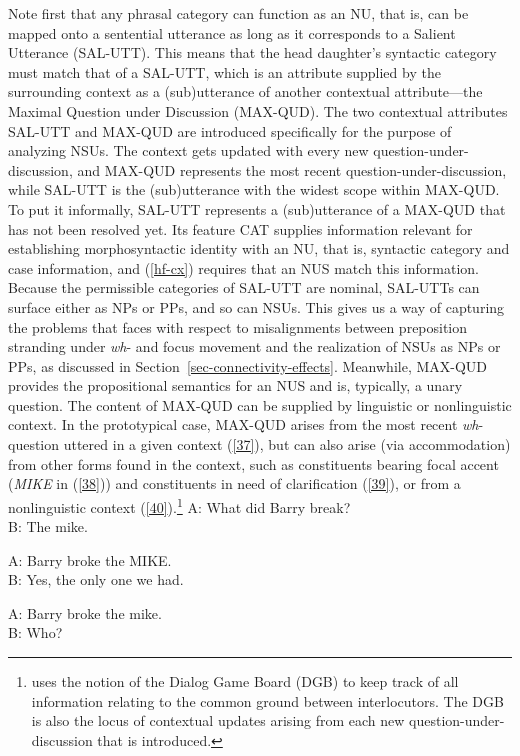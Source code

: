 {Note first that any phrasal category
can function as an NU, that is, can be mapped onto a sentential utterance as long as it corresponds to a Salient Utterance (SAL-UTT). This means that
the head daughter's syntactic category must match that of a SAL-UTT, which is an attribute supplied by the surrounding context as a (sub)utterance of another contextual attribute---the Maximal Question under Discussion (MAX-QUD). The two contextual attributes SAL-UTT and MAX-QUD are introduced specifically for the purpose of analyzing NSUs. The context gets updated with every new question-under-discussion, and MAX-QUD represents the most recent question-under-discussion, while SAL-UTT is the (sub)utterance with the widest scope within MAX-QUD. To put it informally, SAL-UTT represents a (sub)utterance of a MAX-QUD that has not been resolved yet. Its feature CAT supplies information relevant for establishing morphosyntactic identity with an NU, that is, syntactic category and case information, and (\ref{hf-cx}) requires that an NUS match this information. Because the permissible categories of SAL-UTT are nominal, SAL-UTTs can surface either as NPs or PPs, and so can NSUs. This gives us a way of capturing the problems that \citet{Merchant2001, Merchant2005a} faces with respect to misalignments between preposition stranding under \emph{wh}- and focus movement and the realization of NSUs as NPs or PPs, as discussed in Section~\ref{sec-connectivity-effects}. Meanwhile, MAX-QUD provides the propositional semantics for an NUS and is, typically, a unary question. The content of MAX-QUD can be supplied by linguistic or nonlinguistic context. In the prototypical case, MAX-QUD arises from the most recent \emph{wh}-question uttered in a given context (\ref{37}), but can also arise (via accommodation) from other forms found in the context, such as constituents bearing focal accent ({\it MIKE} in (\ref{38})) and constituents in need of clarification (\ref{39}), or from a nonlinguistic context (\ref{40}).\footnote{\citet{Ginzburg2012} uses the notion of the Dialog Game Board (DGB) to keep track of all information relating to the common ground between interlocutors. The DGB is also the locus of contextual updates arising from each new question-under-discussion that is introduced.}
\ea
A: What did Barry break? \\
B: The mike.\label{37}
\z

\ea
A: Barry broke the MIKE. \\
B: Yes, the only one we had.\label{38}
\z

\ea
A: Barry broke the mike. \\
B: Who?\label{39}
\z

}
